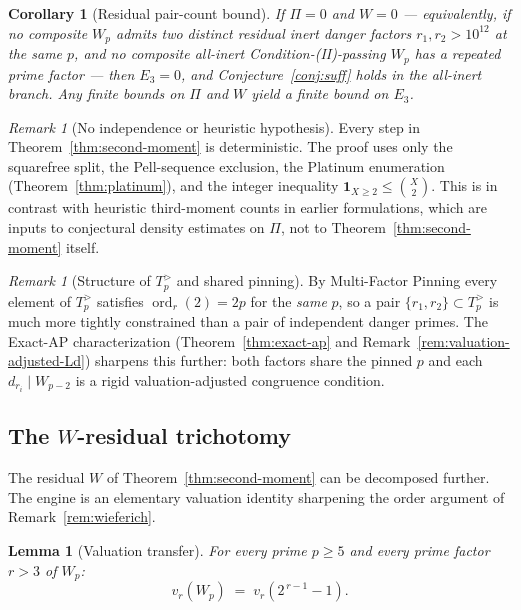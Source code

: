 \documentclass[11pt]{amsart}
\theoremstyle{plain}
\newtheorem{lemma}[theorem]{Lemma}
\newtheorem{corollary}[theorem]{Corollary}
\theoremstyle{definition}
\theoremstyle{remark}
\newtheorem{remark}[theorem]{Remark}
\numberwithin{equation}{section}
\newcommand{\ord}{\operatorname{ord}}
\begin{document}
\begin{corollary}[Residual pair-count bound]\label{cor:residual-bound}
If $\Pi = 0$ and $W = 0$ --- equivalently, if no composite $W_p$ admits two distinct residual inert danger factors $r_1, r_2 > 10^{12}$ at the same $p$, and no composite all-inert Condition-(II)-passing $W_p$ has a repeated prime factor --- then $E_3 = 0$, and Conjecture~\ref{conj:suff} holds in the all-inert branch. Any finite bounds on $\Pi$ and $W$ yield a finite bound on $E_3$.
\end{corollary}

\begin{remark}[No independence or heuristic hypothesis]\label{rem:no-heuristic}
Every step in Theorem~\ref{thm:second-moment} is deterministic. The proof uses only the squarefree split, the Pell-sequence exclusion, the Platinum enumeration (Theorem~\ref{thm:platinum}), and the integer inequality $\mathbf{1}_{X \geq 2} \leq \binom{X}{2}$. This is in contrast with heuristic third-moment counts in earlier formulations, which are inputs to conjectural density estimates on $\Pi$, not to Theorem~\ref{thm:second-moment} itself.
\end{remark}

\begin{remark}[Structure of $T_p^{>}$ and shared pinning]\label{rem:structure-Tp}
By Multi-Factor Pinning every element of $T_p^{>}$ satisfies $\ord_r(2) = 2 p$ for the \emph{same} $p$, so a pair $\{r_1, r_2\} \subset T_p^{>}$ is much more tightly constrained than a pair of independent danger primes. The Exact-AP characterization (Theorem~\ref{thm:exact-ap} and Remark~\ref{rem:valuation-adjusted-Ld}) sharpens this further: both factors share the pinned $p$ and each $d_{r_i} \mid W_{p-2}$ is a rigid valuation-adjusted congruence condition.
\end{remark}

\subsection{The \texorpdfstring{$W$}{W}-residual trichotomy}\label{sec:w-trichotomy}

The residual $W$ of Theorem~\ref{thm:second-moment} can be decomposed further. The engine is an elementary valuation identity sharpening the order argument of Remark~\ref{rem:wieferich}.

\begin{lemma}[Valuation transfer]\label{lem:w1-valuation}
For every prime $p \geq 5$ and every prime factor $r > 3$ of $W_p$:
\[
  v_r(W_p) \;=\; v_r\!\left(2^{\,r-1} - 1\right).
\]
\end{lemma}
\end{document}
